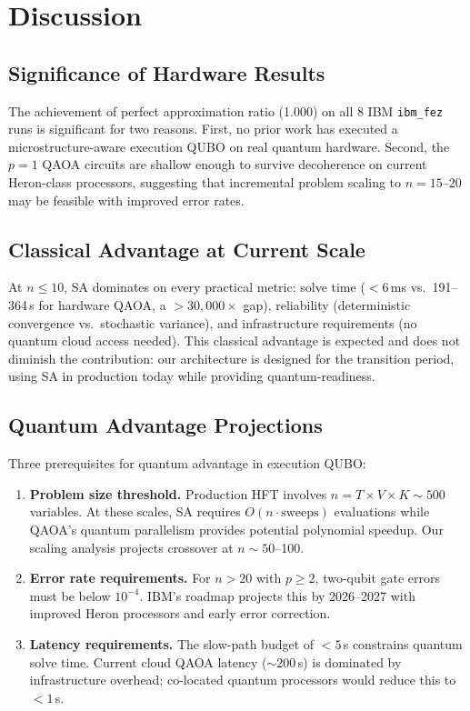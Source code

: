 \documentclass[11pt]{article}
\begin{document}
\section{Discussion}
\label{sec:discussion}

\subsection{Significance of Hardware Results}

The achievement of perfect approximation ratio (1.000) on all 8 IBM \texttt{ibm\_fez} runs is significant for two reasons. First, no prior work has executed a microstructure-aware execution QUBO on real quantum hardware. Second, the $p=1$ QAOA circuits are shallow enough to survive decoherence on current Heron-class processors, suggesting that incremental problem scaling to $n = 15$--20 may be feasible with improved error rates.

\subsection{Classical Advantage at Current Scale}

At $n \leq 10$, SA dominates on every practical metric: solve time ($< 6$\,ms vs.\ 191--364\,s for hardware QAOA, a $> 30{,}000\times$ gap), reliability (deterministic convergence vs.\ stochastic variance), and infrastructure requirements (no quantum cloud access needed). This classical advantage is expected and does not diminish the contribution: our architecture is designed for the transition period, using SA in production today while providing quantum-readiness.

\subsection{Quantum Advantage Projections}

Three prerequisites for quantum advantage in execution QUBO:

\begin{enumerate}[leftmargin=*]
\item \textbf{Problem size threshold.} Production HFT involves $n = T \times V \times K \sim 500$ variables. At these scales, SA requires $O(n \cdot \text{sweeps})$ evaluations while QAOA's quantum parallelism provides potential polynomial speedup. Our scaling analysis projects crossover at $n \sim 50$--100.

\item \textbf{Error rate requirements.} For $n > 20$ with $p \geq 2$, two-qubit gate errors must be below $10^{-4}$. IBM's roadmap projects this by 2026--2027 with improved Heron processors and early error correction.

\item \textbf{Latency requirements.} The slow-path budget of $< 5$\,s constrains quantum solve time. Current cloud QAOA latency ($\sim$200\,s) is dominated by infrastructure overhead; co-located quantum processors would reduce this to $< 1$\,s.
\end{enumerate}
\end{document}
